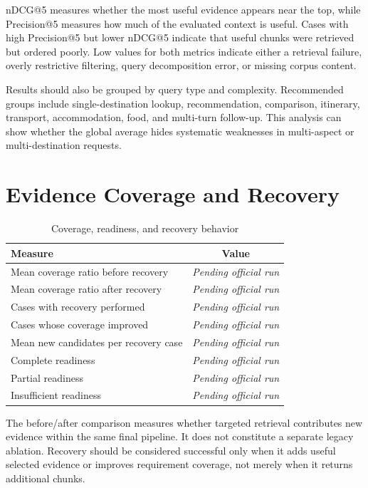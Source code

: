 nDCG@5 measures whether the most useful evidence appears near the top, while
Precision@5 measures how much of the evaluated context is useful. Cases with
high Precision@5 but lower nDCG@5 indicate that useful chunks were retrieved but
ordered poorly. Low values for both metrics indicate either a retrieval failure,
overly restrictive filtering, query decomposition error, or missing corpus
content.

Results should also be grouped by query type and complexity. Recommended groups
include single-destination lookup, recommendation, comparison, itinerary,
transport, accommodation, food, and multi-turn follow-up. This analysis can
show whether the global average hides systematic weaknesses in multi-aspect or
multi-destination requests.

\section{Evidence Coverage and Recovery}

\begin{table}[H]
\centering
\caption{Coverage, readiness, and recovery behavior}
\label{tab:coverage-results}
\begin{tabular}{lc}
\hline
\textbf{Measure} & \textbf{Value} \\
\hline
Mean coverage ratio before recovery & \textit{Pending official run} \\
Mean coverage ratio after recovery & \textit{Pending official run} \\
Cases with recovery performed & \textit{Pending official run} \\
Cases whose coverage improved & \textit{Pending official run} \\
Mean new candidates per recovery case & \textit{Pending official run} \\
Complete readiness & \textit{Pending official run} \\
Partial readiness & \textit{Pending official run} \\
Insufficient readiness & \textit{Pending official run} \\
\hline
\end{tabular}
\end{table}

The before/after comparison measures whether targeted retrieval contributes new
evidence within the same final pipeline. It does not constitute a separate
legacy ablation. Recovery should be considered successful only when it adds
useful selected evidence or improves requirement coverage, not merely when it
returns additional chunks.

